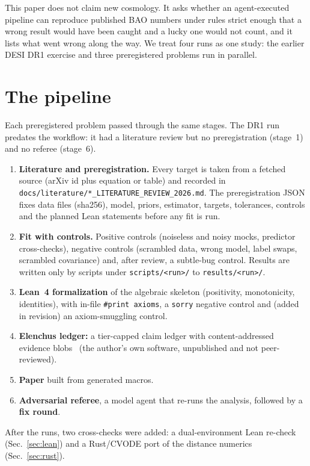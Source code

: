 \documentclass[11pt]{article}
\begin{document}
This paper does not claim new cosmology. It asks whether an agent-executed pipeline can reproduce published BAO numbers under rules
strict enough that a wrong result would have been caught and a lucky one would not count, and it lists what went wrong along the
way. We treat four runs as one study: the earlier DESI DR1 exercise and three preregistered problems run in parallel.

\section{The pipeline}\label{sec:pipeline}
Each preregistered problem passed through the same stages. The DR1 run predates the workflow: it had a literature review but no preregistration (stage~1) and no referee (stage~6).
\begin{enumerate}
\item \textbf{Literature and preregistration.} Every target is taken from a fetched source (arXiv id plus equation or table) and recorded
in \texttt{docs/literature/*\_LITERATURE\_REVIEW\_2026.md}. The preregistration JSON fixes data files (sha256), model, priors,
estimator, targets, tolerances, controls and the planned Lean statements before any fit is run.
\item \textbf{Fit with controls.} Positive controls (noiseless and noisy mocks, predictor cross-checks), negative controls (scrambled
data, wrong model, label swaps, scrambled covariance) and, after review, a subtle-bug control. Results are written only by scripts under
\texttt{scripts/<run>/} to \texttt{results/<run>/}.
\item \textbf{Lean~4 formalization} of the algebraic skeleton (positivity, monotonicity, identities), with in-file
\texttt{\#print axioms}, a \texttt{sorry} negative control and (added in revision) an axiom-smuggling control.
\item \textbf{Elenchus ledger:} a tier-capped claim ledger with content-addressed evidence blobs~\cite{elenchus} (the author's own software,
unpublished and not peer-reviewed).
\item \textbf{Paper} built from generated macros.
\item \textbf{Adversarial referee}, a model agent that re-runs the analysis, followed by a \textbf{fix round}.
\end{enumerate}
After the runs, two cross-checks were added: a dual-environment Lean re-check (Sec.~\ref{sec:lean}) and a Rust/CVODE port of the
distance numerics (Sec.~\ref{sec:rust}).
\end{document}
